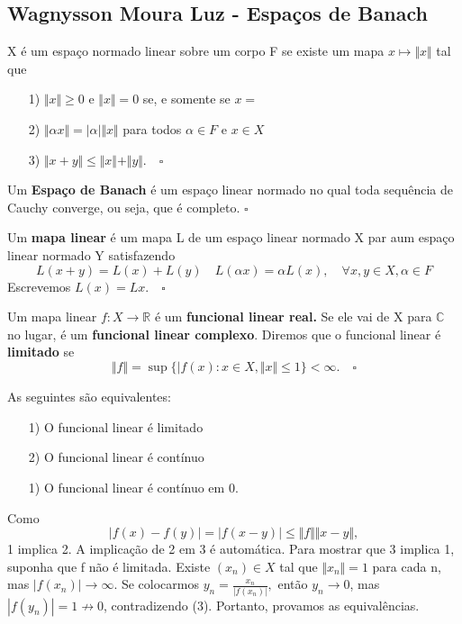 \documentclass[MeasureTheory/measure_theory.tex]{subfiles}
\begin{document}
\subsection{Wagnysson Moura Luz - Espaços de Banach}
\begin{def*}
	X é um espaço normado linear sobre um corpo F se existe um mapa \(x\mapsto \Vert x \Vert\) tal que
	\begin{itemize}
		\item[1)] \(\Vert x \Vert \geq 0\) e \(\Vert x \Vert = 0\) se, e somente se \(x=\)
		\item[2)] \(\Vert \alpha x \Vert = |\alpha |\Vert x \Vert\) para todos \(\alpha \in F\) e \(x\in X\)
		\item[3)] \(\Vert x + y \Vert \leq \Vert x \Vert + \Vert y \Vert. \quad \square\)
	\end{itemize}
\end{def*}
\begin{def*}
	Um \textbf{Espaço de Banach} é um espaço linear normado no qual toda sequência de Cauchy converge, ou seja, que é completo. \(\square\)
\end{def*}
\begin{def*}
	Um \textbf{mapa linear} é um mapa L de um espaço linear normado X par aum espaço linear normado Y satisfazendo
	\[
		L(x+y) = L(x) + L(y)\quad L(\alpha x) = \alpha L(x),\quad \forall x, y\in X, \alpha \in F
	\]
	Escrevemos \(L(x) = Lx. \quad \square\)
\end{def*}
\begin{def*}
	Um mapa linear \(f:X\rightarrow \mathbb{R}\) é um \textbf{funcional linear real.} Se ele vai de X para \(\mathbb{C}\) no lugar, é um \textbf{funcional linear complexo}. Diremos que o funcional linear é \textbf{limitado } se
	\[
		\Vert f \Vert = \sup_{}\{|f(x):x\in X, \Vert x \Vert \leq 1\} < \infty. \quad \square
	\]
\end{def*}
\begin{prop*}
	As seguintes são equivalentes:
	\begin{itemize}
		\item[1)] O funcional linear é limitado
		\item[2)] O funcional linear é contínuo
		\item[1)] O funcional linear é contínuo em 0.
	\end{itemize}
\end{prop*}
\begin{proof*}
	Como
	\[
		|f(x) - f(y)| = |f(x-y)|\leq \Vert f \Vert\Vert x-y \Vert,
	\]
	1 implica 2. A implicação de 2 em 3 é automática. Para mostrar que 3 implica 1, suponha que f não é limitada. Existe \((x_{n})\in X\) tal que \(\Vert x_{n} \Vert = 1\) para cada n, mas \(|f(x_{n})|\to \infty.\) Se colocarmos \(y_{n} = \frac{x_{n}}{|f(x_{n})|},\) então \(y_{n}\to 0\), mas
	\(|f(y_{n})| = 1\not\to 0\), contradizendo (3). Portanto, provamos as equivalências. \qedsymbol
\end{proof*}
\end{document}
